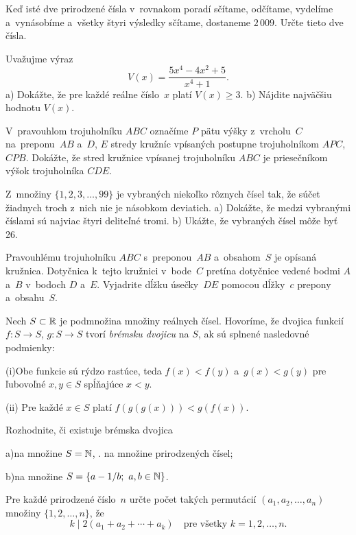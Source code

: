 {%
Keď isté dve prirodzené čísla v~rovnakom poradí sčítame, odčítame, vydelíme a~vynásobíme a~všetky štyri výsledky sčítame, dostaneme $2\,009$. Určte tieto dve čísla.}

{%
Uvažujme výraz
$$
V(x)=\frac{5x^{4}-4x^{2}+5}{x^{4}+1}.
$$
\ite a) Dokážte, že pre každé reálne číslo~$x$ platí $V(x)\ge3$.
\ite b) Nájdite najväčšiu hodnotu $V(x)$.}

{%
V~pravouhlom trojuholníku $ABC$ označíme $P$ pätu výšky z~vrcholu~$C$ na~preponu~$AB$ a~$D$, $E$ stredy kružníc vpísaných postupne trojuholníkom $APC$, $CPB$. Dokážte, že stred kružnice vpísanej trojuholníku $ABC$ je priesečníkom výšok trojuholníka $CDE$.}

{%
Z~množiny $\{1,2,3,\dots,99\}$ je vybraných niekoľko rôznych čísel tak, že súčet žiadnych troch z~nich nie je násobkom deviatich.
\ite a) Dokážte, že medzi vybranými číslami sú najviac štyri deliteľné tromi.
\ite b) Ukážte, že vybraných čísel môže byť 26.}

{%
Pravouhlému trojuholníku $ABC$ s~preponou~$AB$ a~obsahom~$S$ je opísaná kružnica. Dotyčnica k~tejto kružnici v~bode~$C$ pretína dotyčnice vedené bodmi $A$ a~$B$ v~bodoch $D$ a~$E$. Vyjadrite dĺžku úsečky~$DE$ pomocou dĺžky~$c$ prepony a~obsahu~$S$.}

{%
Nech $S\subset\Bbb R$ je podmnožina množiny reálnych čísel. Hovoríme, že dvojica funkcií $f\colon S\to S$, $g\colon S\to S$ tvorí {\it brémsku dvojicu} na $S$, ak sú splnené nasledovné podmienky:
\item{(i)}Obe funkcie sú rýdzo rastúce, teda $f(x)<f(y)$ a~$g(x)<g(y)$ pre ľubovoľné $x,y\in S$ spĺňajúce $x<y$.
\item{(ii)} Pre každé $x\in S$ platí $f(g(g(x)))<g(f(x))$.

Rozhodnite, či existuje brémska dvojica
\item{a)}na množine $S=\Bbb N$, \tj. na množine prirodzených čísel;
\item{b)}na množine $S=\{a-1/b;\ a,b\in\Bbb N\}$.}

{%
Pre každé prirodzené číslo~$n$ určte počet takých permutácií $(a_1,a_2,\dots,a_n)$ množiny $\{1,2,\dots,n\}$, že
$$
k\mid 2(a_1+a_2+\cdots+a_k)\quad\text{pre všetky $k=1,2,\dots,n$.}
$$}

